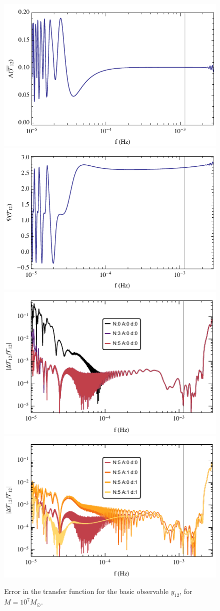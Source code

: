 \documentclass[aps,showpacs,%
prd,superscriptaddress,nofootinbib]{revtex4}
\newcommand{\Msol}{M_{\odot}}
\begin{document}
\begin{figure}
  \centering
  \includegraphics[width=.48\linewidth]{plots/LISAtransferM1e7y12Lamp.pdf}
  \hspace{0.2cm}
  \includegraphics[width=.48\linewidth]{plots/LISAtransferM1e7y12Lphase.pdf}
  \includegraphics[width=.48\linewidth]{plots/LISAerrorM1e7y12LcorrPsi.pdf}
  \hspace{0.2cm}
  \includegraphics[width=.48\linewidth]{plots/LISAerrorM1e7y12LcorrAd.pdf}
  \caption{Error in the transfer function for the basic observable $y_{12}$, for $M=10^{7} \Msol$.}
  \label{fig:prectoymodel}
\end{figure}
\end{document}
